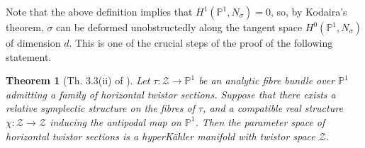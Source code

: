\documentclass[11pt, a4paper]{amsart}
\numberwithin{equation}{section}
\newtheorem{theorem}{Theorem}[section]
\theoremstyle{definition}
\theoremstyle{remark}
\newcommand{\Zz}{\mathcal{Z}}
\newcommand{\PP}{\mathbb{P}}
\renewcommand{\to}{\longrightarrow}
\begin{document}
Note that the above definition implies that $H^1(\PP^1, N_\sigma) = 0$, so, by Kodaira's theorem, $\sigma$ can be deformed unobstructedly along the tangent space $H^0(\PP^1, N_\sigma)$ of dimension $d$. This is one of the crucial steps of the proof of the following statement.

\begin{theorem}[Th. 3.3(ii) of \cite{HKLR}] \label{tm HKLR}
Let $\tau: \Zz \to \PP^1$ be an analytic fibre bundle over $\PP^1$ admitting a family of horizontal twistor sections. Suppose that there exists a relative symplectic structure on the fibres of $\tau$, and a compatible real structure $\chi : \Zz \to \Zz$ inducing the antipodal map on $\PP^1$. Then the parameter space of horizontal twistor sections is a hyperK\"ahler manifold with twistor space $\Zz$.
\end{theorem}
\end{document}
